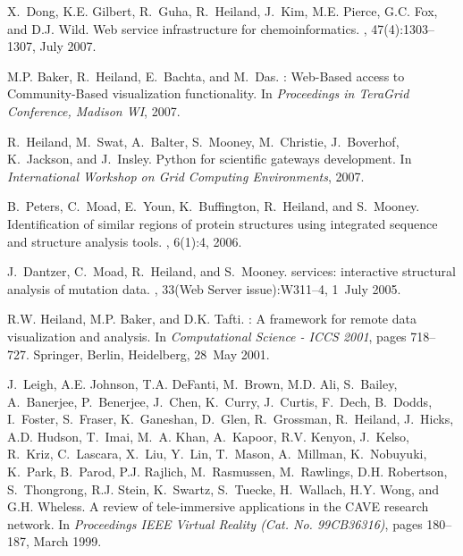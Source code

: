 \documentclass[letterpaper,11pt]{article}
\begin{document}
\begin{enumerate}
X.~Dong, K.E. Gilbert, R.~Guha, R.~Heiland, J.~Kim, M.E. Pierce, G.C. Fox, and
D.J. Wild.
\newblock Web service infrastructure for chemoinformatics.
, 47(4):1303--1307, July 2007.

M.P. Baker, R.~Heiland, E.~Bachta, and M.~Das.
: {Web-Based} access to {Community-Based} visualization
functionality.
\newblock In {\em Proceedings in {TeraGrid} Conference, Madison {WI}}, 2007.

R.~Heiland, M.~Swat, A.~Balter, S.~Mooney, M.~Christie, J.~Boverhof,
K.~Jackson, and J.~Insley.
\newblock Python for scientific gateways development.
\newblock In {\em International Workshop on Grid Computing Environments}, 2007.

B.~Peters, C.~Moad, E.~Youn, K.~Buffington, R.~Heiland, and S.~Mooney.
\newblock Identification of similar regions of protein structures using
integrated sequence and structure analysis tools.
, 6(1):4, 2006.

J.~Dantzer, C.~Moad, R.~Heiland, and S.~Mooney.
 services: interactive structural analysis of mutation data.
, 33(Web Server issue):W311--4, 1~July 2005.

R.W. Heiland, M.P. Baker, and D.K. Tafti.
: A framework for remote data visualization and analysis.
\newblock In {\em Computational Science - {ICCS} 2001}, pages 718--727.
Springer, Berlin, Heidelberg, 28~May 2001.

J.~Leigh, A.E. Johnson, T.A. DeFanti, M.~Brown, M.D. Ali, S.~Bailey,
A.~Banerjee, P.~Benerjee, J.~Chen, K.~Curry, J.~Curtis, F.~Dech, B.~Dodds,
I.~Foster, S.~Fraser, K.~Ganeshan, D.~Glen, R.~Grossman, R.~Heiland,
J.~Hicks, A.D. Hudson, T.~Imai, M.~A. Khan, A.~Kapoor, R.V. Kenyon, J.~Kelso,
R.~Kriz, C.~Lascara, X.~Liu, Y.~Lin, T.~Mason, A.~Millman, K.~Nobuyuki,
K.~Park, B.~Parod, P.J. Rajlich, M.~Rasmussen, M.~Rawlings, D.H. Robertson,
S.~Thongrong, R.J. Stein, K.~Swartz, S.~Tuecke, H.~Wallach, H.Y. Wong, and
G.H. Wheless.
\newblock A review of tele-immersive applications in the {CAVE} research
network.
\newblock In {\em Proceedings {IEEE} Virtual Reality (Cat. No. {99CB36316})},
pages 180--187, March 1999.


\end{enumerate}
\end{document}
